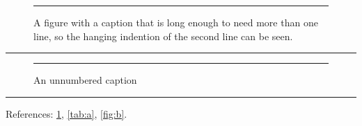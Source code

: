 \documentclass{article}
\begin{document}
\listoffigures
\listoftables

\begin{figure}[h]
  \centering
  \rule{4cm}{1cm}
  \caption{A figure with a caption that is long enough to need more than one line,
    so the hanging indention of the second line can be seen.}
  \label{fig:a}
\end{figure}

\begin{table}[h]
  \centering
  \caption{A table}
  \label{tab:a}
  \rule{4cm}{1cm}
\end{table}

\begin{figure}[h]
  \centering
  \rule{4cm}{1cm}
  \caption*{An unnumbered caption}
\end{figure}

\begin{center}
  \begin{minipage}{.5\linewidth}
    \centering
    \rule{2cm}{1cm}
    \label{fig:b}
  \end{minipage}
\end{center}

References: \ref{fig:a}, \ref{tab:a}, \ref{fig:b}.
\end{document}
